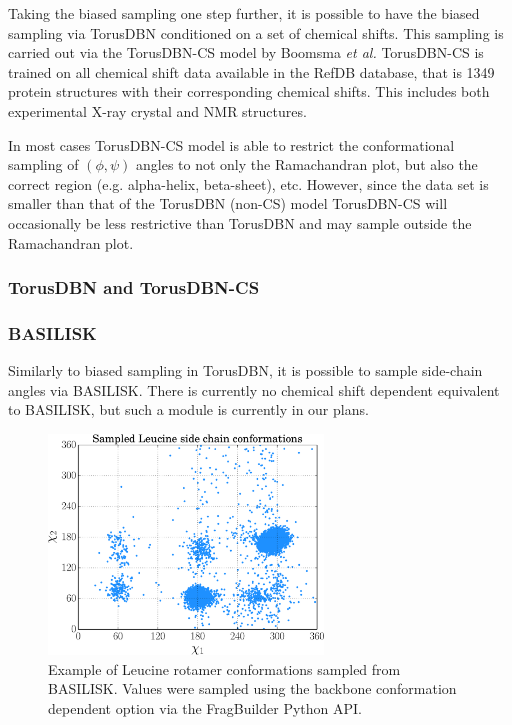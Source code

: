 Taking the biased sampling one step further, it is possible to have the biased sampling via TorusDBN conditioned on a set of chemical shifts.
This sampling is carried out via the TorusDBN-CS model by Boomsma \textit{et al.} TorusDBN-CS is trained on all chemical shift data available in the RefDB database, that is 1349 protein structures with their corresponding chemical shifts. This includes both experimental X-ray crystal and NMR structures.

In most cases TorusDBN-CS model is able to restrict the conformational sampling of $(\phi, \psi)$ angles to not only the Ramachandran plot, but also the correct region (e.g. alpha-helix, beta-sheet), etc.
However, since the data set is smaller than that of the TorusDBN (non-CS) model TorusDBN-CS will occasionally be less restrictive than TorusDBN and may sample outside the Ramachandran plot.



\subsubsection{TorusDBN and TorusDBN-CS}


\subsubsection{BASILISK}

Similarly to biased sampling in TorusDBN, it is possible to sample side-chain angles via BASILISK. There is currently no chemical shift dependent equivalent to BASILISK, but such a module is currently in our plans.


\begin{figure}
    \centering
    \includegraphics[width=0.65\textwidth]{figures/leu_sc.pdf}
    \caption{Example of Leucine rotamer conformations sampled from BASILISK. Values were sampled using the backbone conformation dependent option via the FragBuilder Python API.}
    \label{fig:leu_sc}
\end{figure}


